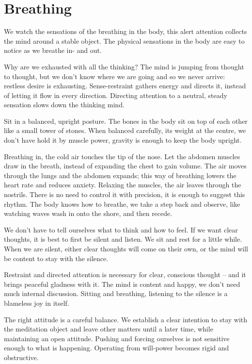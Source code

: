 \hypertarget{breathing-1}{%
\chapter{Breathing}\label{breathing-1}}

We watch the sensations of the breathing in the body, this alert
attention collects the mind around a stable object. The physical
sensations in the body are easy to notice as we breathe in- and out.

Why are we exhausted with all the thinking? The mind is jumping from
thought to thought, but we don't know where we are going and so we never
arrive: restless desire is exhausting. Sense-restraint gathers energy
and directs it, instead of letting it flow in every direction. Directing
attention to a neutral, steady sensation slows down the thinking mind.

Sit in a balanced, upright posture. The bones in the body sit on top of
each other like a small tower of stones. When balanced carefully, its
weight at the centre, we don't have hold it by muscle power, gravity is
enough to keep the body upright.

Breathing in, the cold air touches the tip of the nose. Let the abdomen
muscles draw in the breath, instead of expanding the chest to gain
volume. The air moves through the lungs and the abdomen expands; this
way of breathing lowers the heart rate and reduces anxiety. Relaxing the
muscles, the air leaves through the nostrils. There is no need to
control it with precision, it is enough to suggest this rhythm. The body
knows how to breathe, we take a step back and observe, like watching
waves wash in onto the shore, and then recede.

We don't have to tell ourselves what to think and how to feel. If we
want clear thoughts, it is best to first be silent and listen. We sit
and rest for a little while. When we are silent, either clear thoughts
will come on their own, or the mind will be content to stay with the
silence.

Restraint and directed attention is necessary for clear, conscious
thought -- and it brings peaceful gladness with it. The mind is content
and happy, we don't need much internal discussion. Sitting and
breathing, listening to the silence is a blameless joy in itself.

The right attitude is a careful balance. We establish a clear intention
to stay with the meditation object and leave other matters until a later
time, while maintaining an open attitude. Pushing and forcing ourselves
is not sensitive enough to what is happening. Operating from will-power
becomes rigid and obstructive.

